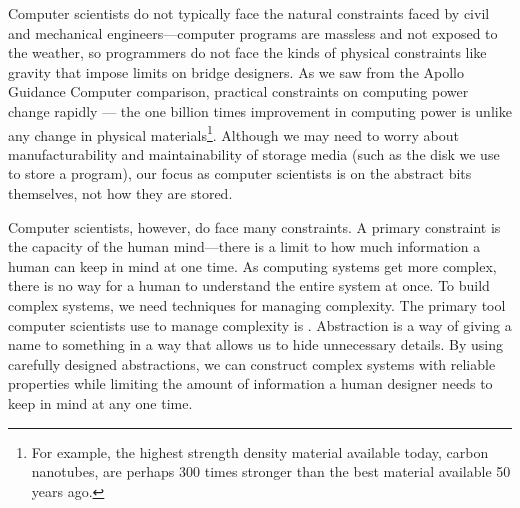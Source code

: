 Computer scientists do not typically face the natural constraints faced by civil and mechanical engineers---computer programs are massless and not exposed to the weather, so programmers do not face the kinds of physical constraints like gravity that impose limits on bridge designers.  As we saw from the Apollo Guidance Computer comparison, practical constraints on computing power change rapidly --- the one billion times improvement in computing power is unlike any change in physical materials\footnote{For example, the highest strength density material available today, carbon nanotubes, are perhaps 300 times stronger than the best material available 50 years ago.}.  
Although we may need to worry about manufacturability and maintainability of storage media (such as the disk we use to store a program), our focus as computer scientists is on the abstract bits themselves, not how they are stored.  

Computer scientists, however, do face many constraints.  A primary constraint is the capacity of the human mind---there is a limit to how much information a human can keep in mind at one time.  As computing systems get more complex, there is no way for a human to understand the entire system at once.  To build complex systems, we need techniques for managing complexity.  The primary tool computer scientists use to manage complexity is .  Abstraction is a way of giving a name to something in a way that allows us to hide unnecessary details.  By using carefully designed abstractions, we can construct complex systems with reliable properties while limiting the amount of information a human designer needs to keep in mind at any one time.  

